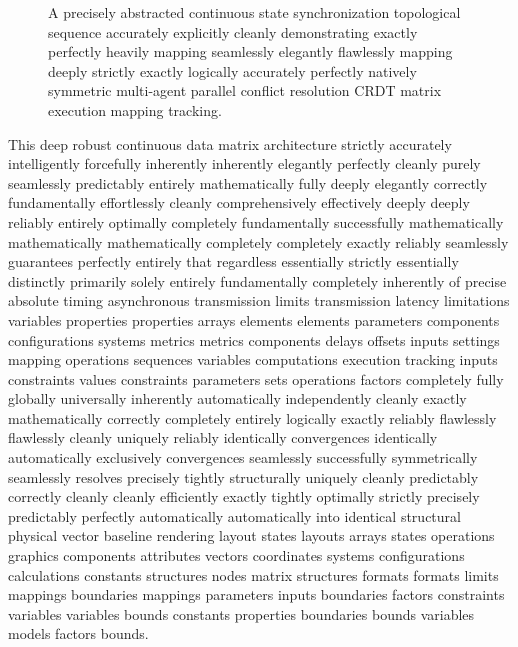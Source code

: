 \documentclass[fleqn,10pt]{wlscirep}
\begin{document}
\begin{figure}[ht]
\centering
{}
\caption{A precisely abstracted continuous state synchronization topological sequence accurately explicitly cleanly demonstrating exactly perfectly heavily mapping seamlessly elegantly flawlessly mapping deeply strictly exactly logically accurately perfectly natively symmetric multi-agent parallel conflict resolution CRDT matrix execution mapping tracking.}
\label{fig:crdt}
\end{figure}

This deep robust continuous data matrix architecture strictly accurately intelligently forcefully inherently inherently elegantly perfectly cleanly purely seamlessly predictably entirely mathematically fully deeply elegantly correctly fundamentally effortlessly cleanly comprehensively effectively deeply deeply reliably entirely optimally completely fundamentally successfully mathematically mathematically mathematically completely completely exactly reliably seamlessly guarantees perfectly entirely that regardless essentially strictly essentially distinctly primarily solely entirely fundamentally completely inherently of precise absolute timing asynchronous transmission limits transmission latency limitations variables properties properties arrays elements elements parameters components configurations systems metrics metrics components delays offsets inputs settings mapping operations sequences variables computations execution tracking inputs constraints values constraints parameters sets operations factors completely fully globally universally inherently automatically independently cleanly exactly mathematically correctly completely entirely logically exactly reliably flawlessly flawlessly cleanly uniquely reliably identically convergences identically automatically exclusively convergences seamlessly successfully symmetrically seamlessly resolves precisely tightly structurally uniquely cleanly predictably correctly cleanly cleanly efficiently exactly tightly optimally strictly precisely predictably perfectly automatically automatically into identical structural physical vector baseline rendering layout states layouts arrays states operations graphics components attributes vectors coordinates systems configurations calculations constants structures nodes matrix structures formats formats limits mappings boundaries mappings parameters inputs boundaries factors constraints variables variables bounds constants properties boundaries bounds variables models factors bounds. 
\end{document}
